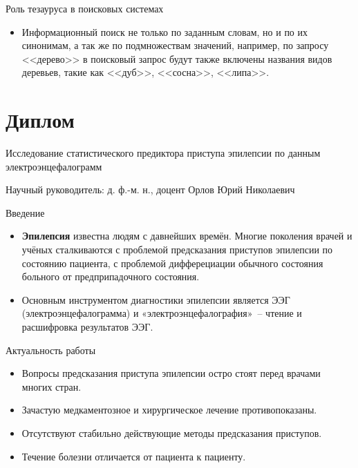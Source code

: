 \documentclass[aspectratio=169]{beamer}
\begin{document}
\begin{frame}{Роль тезауруса в поисковых системах}
  \begin{itemize}
  \item {
    Информационный поиск не только по заданным словам, но и по их синонимам, а так же по подмножествам значений, например, по запросу <<дерево>> в поисковый запрос будут также включены названия видов деревьев, такие как <<дуб>>, <<сосна>>, <<липа>>.
  }
  \end{itemize}
\end{frame}

\section{Диплом}

\begin{frame}
\begin{center}
  \Huge{Исследование статистического предиктора приступа эпилепсии по данным электроэнцефалограмм}
  \par \vspace{10mm}
  \Large{Научный руководитель: д. ф.-м. н., доцент Орлов Юрий Николаевич}
\end{center}
\end{frame}

\begin{frame}{Введение}
  \begin{itemize}
  \item {
    \textbf{Эпилепсия} известна людям с давнейших времён. Многие поколения врачей и учёных сталкиваются с проблемой предсказания приступов эпилепсии по состоянию пациента, с проблемой дифферециации обычного состояния больного от предприпадочного состояния.
  }
  \item {
    Основным инструментом диагностики эпилепсии является ЭЭГ (электроэнцефалограмма) и «электроэнцефалография»~-- чтение и расшифровка результатов ЭЭГ.
  }
  \end{itemize}
\end{frame}

\begin{frame}{Актуальность работы}
  \begin{itemize}
  \item {
    Вопросы предсказания приступа эпилепсии остро стоят перед врачами многих стран.
  }
  \item {
    Зачастую медкаментозное и хирургическое лечение противопоказаны.
  }
  \item {
    Отсутствуют стабильно действующие методы предсказания приступов.
  }
  \item {
    Течение болезни отличается от пациента к пациенту.
  }
  \end{itemize}
\end{frame}
\end{document}

